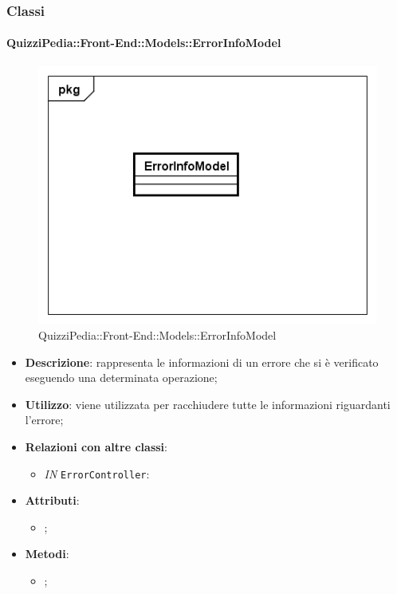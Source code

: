 	\subsubsection{Classi}
		\paragraph{QuizziPedia::Front-End::Models::ErrorInfoModel}
		
		\label{QuizziPedia::Front-End::Models::ErrorInfoModel}
		
		\begin{figure}[h]
			\centering
			\includegraphics[scale=0.5,keepaspectratio]{UML/Classi/Front-End/QuizziPedia_Front-end_Models_ErrorInfoModel.png}
			\caption{QuizziPedia::Front-End::Models::ErrorInfoModel}
		\end{figure}
		
		\begin{itemize}
			\item \textbf{Descrizione}: rappresenta le informazioni di un errore che si è verificato eseguendo una determinata operazione;
			\item \textbf{Utilizzo}: viene utilizzata per racchiudere tutte le informazioni riguardanti l’errore;
			\item \textbf{Relazioni con altre classi}: 
			\begin{itemize}
				\item \textit{IN} \texttt{ErrorController}: 
			\end{itemize}
			\item \textbf{Attributi}: 
			\begin{itemize}
				\item ;
			\end{itemize}
			\item \textbf{Metodi}: 
			\begin{itemize}
				\item ;
			\end{itemize}
		\end{itemize}
			
